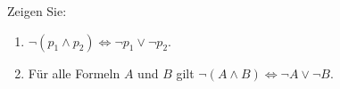 
\begin{exercise}[18]

Zeigen Sie:

\begin{enumerate}[label = \alph*]
    \item $\neg (p_1 \land p_2) \Leftrightarrow \neg p_1 \lor \neg p_2$.
    \item Für alle Formeln $A$ und $B$ gilt $\neg (A \land B) \Leftrightarrow \neg A \lor \neg B$.
\end{enumerate}

\end{exercise}


